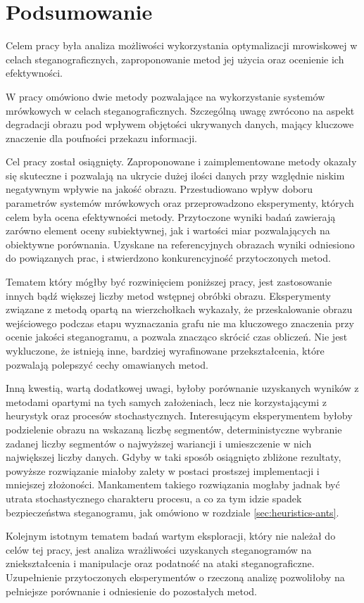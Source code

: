 
\chapter*{Podsumowanie}\label{chap:summary}
{
    Celem pracy była analiza możliwości wykorzystania optymalizacji mrowiskowej w celach steganograficznych,
    zaproponowanie metod jej użycia oraz ocenienie ich efektywności.

    W pracy omówiono dwie metody pozwalające na wykorzystanie systemów mrówkowych w celach steganograficznych.
    Szczególną uwagę zwrócono na aspekt degradacji obrazu pod wpływem objętości ukrywanych danych, mający kluczowe
    znaczenie dla poufności przekazu informacji.

    Cel pracy został osiągnięty. Zaproponowane i zaimplementowane metody okazały się skuteczne i pozwalają na ukrycie
    dużej ilości danych przy względnie niskim negatywnym wpływie na jakość obrazu. Przestudiowano wpływ doboru
    parametrów systemów mrówkowych oraz przeprowadzono eksperymenty, których celem była ocena efektywności metody.
    Przytoczone wyniki badań zawierają zarówno element oceny subiektywnej, jak i wartości miar pozwalających na
    obiektywne porównania. Uzyskane na referencyjnych obrazach wyniki odniesiono do powiązanych prac, i stwierdzono
    konkurencyjność przytoczonych metod.

    Tematem który mógłby być rozwinięciem poniższej pracy, jest zastosowanie innych bądź większej liczby
    metod wstępnej obróbki obrazu. Eksperymenty związane z metodą opartą na wierzchołkach wykazały, że
    przeskalowanie obrazu wejściowego podczas etapu wyznaczania grafu nie ma kluczowego znaczenia przy ocenie
    jakości steganogramu, a pozwala znacząco skrócić czas obliczeń. Nie jest wykluczone, że istnieją inne, bardziej
    wyrafinowane przekształcenia, które pozwalają polepszyć cechy omawianych metod.

    Inną kwestią, wartą dodatkowej uwagi, byłoby porównanie uzyskanych wyników z metodami opartymi na tych samych
    założeniach, lecz nie korzystającymi z heurystyk oraz procesów stochastycznych. Interesującym eksperymentem byłoby
    podzielenie obrazu na wskazaną liczbę segmentów, deterministyczne wybranie zadanej liczby segmentów o najwyższej
    wariancji i umieszczenie w nich największej liczby danych. Gdyby w taki sposób osiągnięto zbliżone rezultaty,
    powyższe rozwiązanie miałoby zalety w postaci prostszej implementacji i mniejszej złożoności. Mankamentem takiego
    rozwiązania mogłaby jadnak być utrata stochastycznego charakteru procesu, a co za tym idzie spadek bezpieczeństwa
    steganogramu, jak omówiono w rozdziale \ref{sec:heuristics-ants}.

    Kolejnym istotnym tematem badań wartym eksploracji, który nie należał do celów tej pracy, jest analiza wrażliwości
    uzyskanych steganogramów na zniekształcenia i manipulacje oraz podatność na ataki steganograficzne. Uzupełnienie
    przytoczonych eksperymentów o rzeczoną analizę pozwoliłoby na pełniejsze porównanie i odniesienie do pozostałych
    metod.
}
